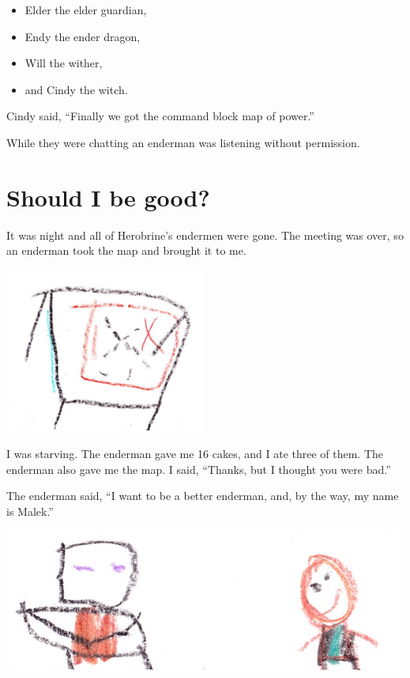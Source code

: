 \documentclass[12pt,oneside]{krantz}
\providecommand{\tightlist}{%
  \setlength{\itemsep}{0pt}\setlength{\parskip}{0pt}}
\begin{document}
\begin{itemize}
\tightlist
\item
  Elder the elder guardian,
\item
  Endy the ender dragon,
\item
  Will the wither,
\item
  and Cindy the witch.
\end{itemize}

Cindy said, ``Finally we got the command block map of power.''

While they were chatting an enderman was listening without permission.

\hypertarget{should-i-be-good}{%
\chapter{Should I be good?}\label{should-i-be-good}}

It was night and all of Herobrine's endermen were gone. The meeting was
over, so an enderman took the map and brought it to me.

\includegraphics[width=2.60417in,height=\textheight]{img/final-war/table-and-map.jpg}

I was starving. The enderman gave me 16 cakes, and I ate three of them.
The enderman also gave me the map. I said, ``Thanks, but I thought you
were bad.''

The enderman said, ``I want to be a better enderman, and, by the way, my
name is Malek.''

\includegraphics[width=5.20833in,height=\textheight]{img/final-war/malek-beckett.jpg}
\end{document}
